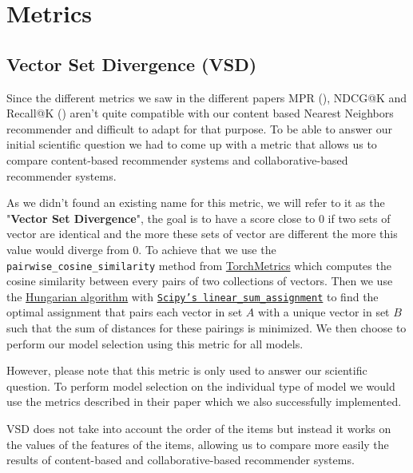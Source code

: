 \chapter{Metrics}
\section{Vector Set Divergence (VSD)} \label{sec:vsd}
Since the different metrics we saw in the different papers MPR (\cite{johnson_logistic_matrix_factorization}), NDCG@K and Recall@K (\cite{liang2018variational}) aren't quite compatible with our content based Nearest Neighbors recommender and difficult to adapt for that purpose. To be able to answer our initial scientific question we had to come up with a metric that allows us to compare content-based recommender systems and collaborative-based recommender systems.

As we didn't found an existing name for this metric, we will refer to it as the "\textbf{Vector Set Divergence}", the goal is to have a score close to 0 if two sets of vector are identical and the more these sets of vector are different the more this value would diverge from 0. To achieve that we use the \texttt{pairwise\_cosine\_similarity} method from \href{https://lightning.ai/docs/torchmetrics/stable/}{TorchMetrics}  which computes the cosine similarity between every pairs of two collections of vectors. Then we use the \href{https://en.wikipedia.org/wiki/Hungarian_algorithm}{Hungarian algorithm} with \href{https://docs.scipy.org/doc/scipy/reference/generated/scipy.optimize.linear_sum_assignment.html}{\texttt{Scipy's linear\_sum\_assignment}} to find the optimal assignment that pairs each vector in set $A$ with a unique vector in set $B$ such that the sum of distances for these pairings is minimized. We then choose to perform our model selection using this metric for all models.

However, please note that this metric is only used to answer our scientific question. To perform model selection on the individual type of model we would use the metrics described in their paper which we also successfully implemented.

VSD does not take into account the order of the items but instead it works on the values of the features of the items, allowing us to compare more easily the results of content-based and collaborative-based recommender systems.

